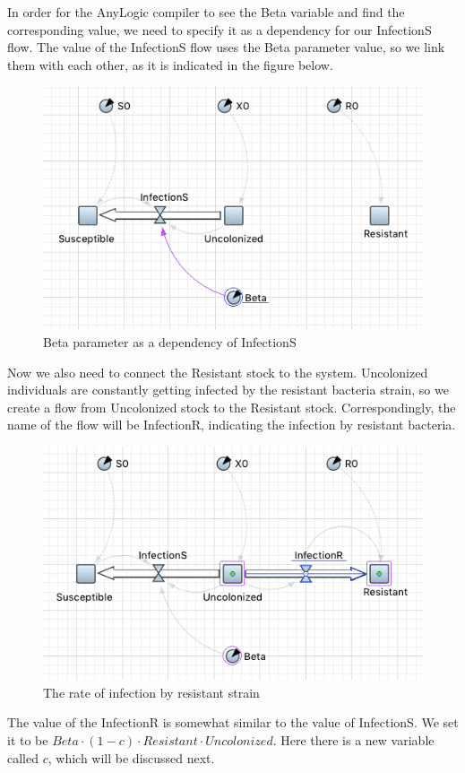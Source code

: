 In order for the AnyLogic compiler to see the Beta variable and find the corresponding value, we need to specify it as a dependency for our InfectionS flow. The value of the InfectionS flow uses the Beta parameter value, so we link them with each other, as it is indicated in the figure below.

\begin{figure}[H]
  \centering
  \includegraphics[height=0.5\textwidth]{img/screens/basic/basic15}
  \caption{Beta parameter as a dependency of InfectionS}
\end{figure}

Now we also need to connect the Resistant stock to the system. Uncolonized individuals are constantly getting infected by the resistant bacteria strain, so we create a flow from Uncolonized stock to the Resistant stock. Correspondingly, the name of the flow will be InfectionR, indicating the infection by resistant bacteria.

\begin{figure}[H]
  \centering
  \includegraphics[height=0.5\textwidth]{img/screens/basic/basic17}
  \caption{The rate of infection by resistant strain}
\end{figure}

The value of the InfectionR is somewhat similar to the value of InfectionS. We set it to be $Beta \cdot (1-c) \cdot Resistant \cdot Uncolonized$. Here there is a new variable called $c$, which will be discussed next.

